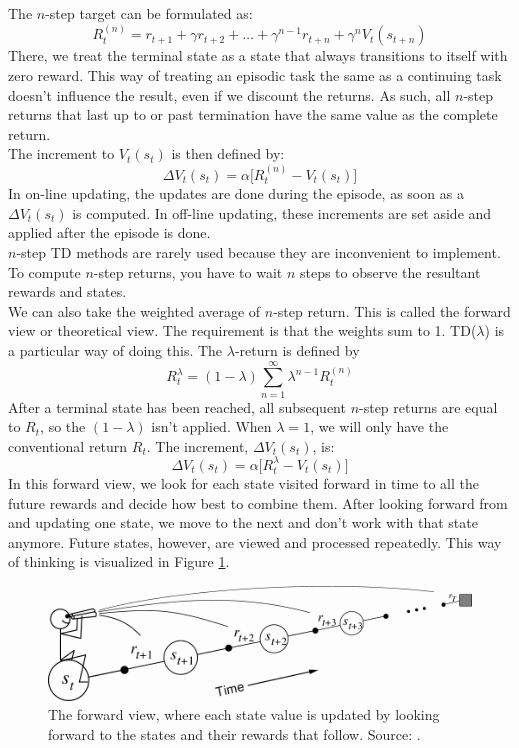 \documentclass[a4paper]{article}
\begin{document}
The $n$-step target can be formulated as:
\begin{equation}
R_t^{(n)} = r_{t+1} + \gamma r_{t+2} + \dots + \gamma^{n-1}r_{t+n} + \gamma^n V_t(s_{t+n})
\end{equation}
There, we treat the terminal state as a state that always transitions to itself with zero reward. This way of treating an episodic task the same as a continuing task doesn't influence the result, even if we discount the returns. As such, all $n$-step returns that last up to or past termination have the same value as the complete return.\\
The increment to $V_t(s_t)$ is then defined by:
\begin{equation}
\Delta V_t(s_t) = \alpha \big[ R_t^{(n)} - V_t(s_t) \big]
\end{equation}
In on-line updating, the updates are done during the episode, as soon as a $\Delta V_t(s_t)$ is computed. In off-line updating, these increments are set aside and applied after the episode is done.\\
$n$-step TD methods are rarely used because they are inconvenient to implement. To compute $n$-step returns, you have to wait $n$ steps to observe the resultant rewards and states.\\

We can also take the weighted average of $n$-step return. This is called the forward view or theoretical view. The requirement is that the weights sum to 1. TD($\lambda$) is a particular way of doing this. The $\lambda$-return is defined by
\begin{equation}
R^\lambda_t = (1-\lambda) \sum_{n=1}^{\infty} \lambda^{n-1} R_t^{(n)}
\end{equation}
After a terminal state has been reached, all subsequent $n$-step returns are equal to $R_t$, so the $(1-\lambda)$ isn't applied. When $\lambda=1$, we will only have the conventional return $R_t$. The increment, $\Delta V_t(s_t)$, is:
\begin{equation}
\Delta V_t(s_t) = \alpha \big[ R_t^{\lambda} - V_t(s_t) \big]
\end{equation}
In this forward view, we look for each state visited forward in time to all the future rewards and decide how best to combine them. After looking forward from and updating one state, we move to the next and don't work with that state anymore. Future states, however, are viewed and processed repeatedly. This way of thinking is visualized in Figure \ref{fig:TDForwardView}.
\begin{figure}[H]
\includegraphics[width=\linewidth]{images/TDForwardView.png}
\caption{The forward view, where each state value is updated by looking forward to the states and their rewards that follow. Source: \cite{Sutton1998ReinforcementIntroductionb}.}
\label{fig:TDForwardView}
\end{figure}
\end{document}
